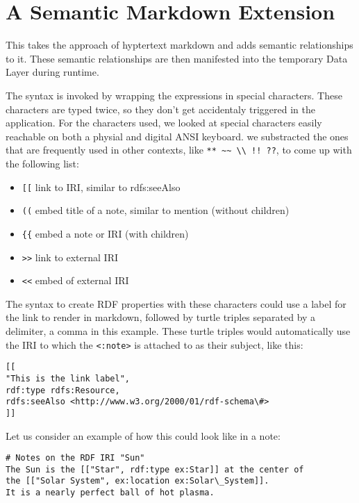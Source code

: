 \section{A Semantic Markdown Extension}

This takes the approach of hyptertext markdown and adds semantic relationships to it. These semantic relationships are then manifested into the temporary Data Layer during runtime.

The syntax is invoked by wrapping the expressions in special characters. These characters are typed twice, so they don’t get accidentaly triggered in the application. For the characters used, we looked at special characters easily reachable on both a physial  and digital ANSI keyboard. we substracted the ones that are frequently used in other contexts, like \verb|** ~~ \\ !! ??|, to come up with the following list:
\begin{itemize}
    \item \verb|[[| link to IRI, similar to rdfs:seeAlso
    \item \verb|((| embed title of a note, similar to mention (without children)
    \item \verb|{{| embed a note or IRI (with children)
    \item \verb|>>| link to external IRI
    \item \verb|<<| embed of external IRI
\end{itemize}

The syntax to create RDF properties with these characters could use a label for the link to render in markdown, followed by turtle triples separated by a delimiter, a comma in this example. These turtle triples would automatically use the IRI to which the \verb|<:note>| is attached to as their subject, like this:

\begin{verbatim}
[[
"This is the link label", 
rdf:type rdfs:Resource, 
rdfs:seeAlso <http://www.w3.org/2000/01/rdf-schema\#>
]]
\end{verbatim}

Let us consider an example of how this could look like in a note:
\begin{verbatim}
# Notes on the RDF IRI "Sun"
The Sun is the [["Star", rdf:type ex:Star]] at the center of 
the [["Solar System", ex:location ex:Solar\_System]]. 
It is a nearly perfect ball of hot plasma.
\end{verbatim}


